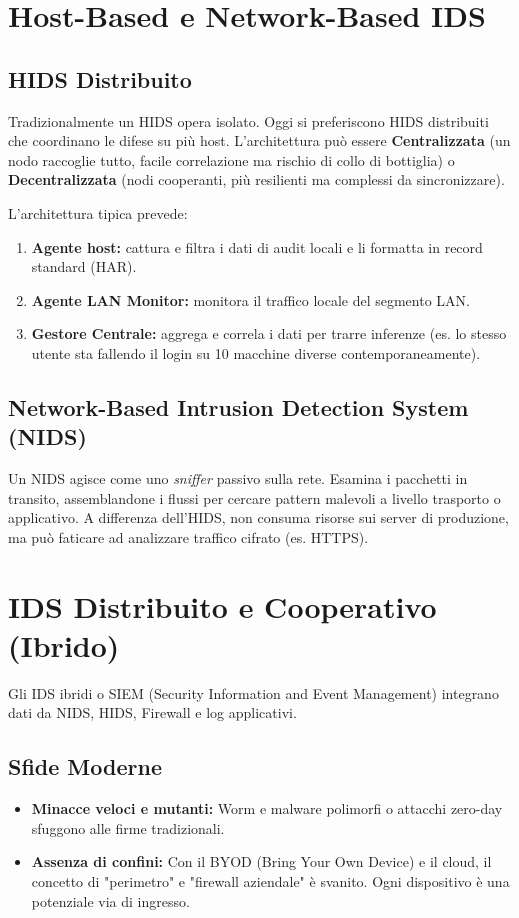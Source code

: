 \section{Host-Based e Network-Based IDS}

\subsection{HIDS Distribuito}
Tradizionalmente un HIDS opera isolato. Oggi si preferiscono HIDS distribuiti che coordinano le difese su più host.
L'architettura può essere \textbf{Centralizzata} (un nodo raccoglie tutto, facile correlazione ma rischio di collo di bottiglia) o \textbf{Decentralizzata} (nodi cooperanti, più resilienti ma complessi da sincronizzare).

L'architettura tipica prevede:
\begin{enumerate}
    \item \textbf{Agente host:} cattura e filtra i dati di audit locali e li formatta in record standard (HAR).
    \item \textbf{Agente LAN Monitor:} monitora il traffico locale del segmento LAN.
    \item \textbf{Gestore Centrale:} aggrega e correla i dati per trarre inferenze (es. lo stesso utente sta fallendo il login su 10 macchine diverse contemporaneamente).
\end{enumerate}

\subsection{Network-Based Intrusion Detection System (NIDS)}
Un NIDS agisce come uno \textit{sniffer} passivo sulla rete. Esamina i pacchetti in transito, assemblandone i flussi per cercare pattern malevoli a livello trasporto o applicativo. A differenza dell'HIDS, non consuma risorse sui server di produzione, ma può faticare ad analizzare traffico cifrato (es. HTTPS).

\section{IDS Distribuito e Cooperativo (Ibrido)}

Gli IDS ibridi o SIEM (Security Information and Event Management) integrano dati da NIDS, HIDS, Firewall e log applicativi.

\subsection{Sfide Moderne}
\begin{itemize}
    \item \textbf{Minacce veloci e mutanti:} Worm e malware polimorfi o attacchi zero-day sfuggono alle firme tradizionali.
    \item \textbf{Assenza di confini:} Con il BYOD (Bring Your Own Device) e il cloud, il concetto di "perimetro" e "firewall aziendale" è svanito. Ogni dispositivo è una potenziale via di ingresso.
\end{itemize}

